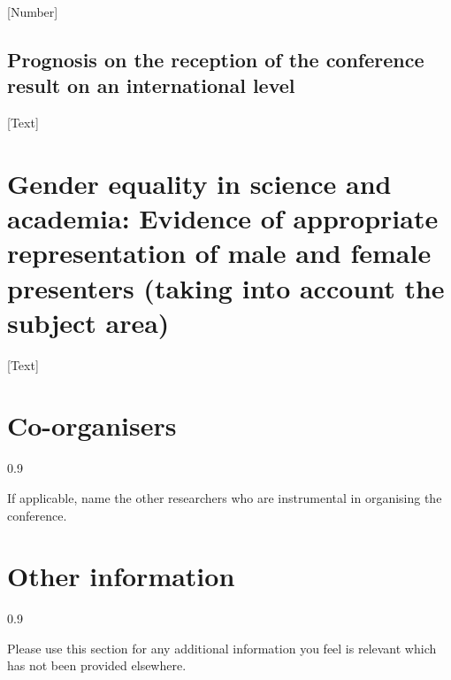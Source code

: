 \documentclass[a4paper,11pt]{article}
\newenvironment{comment}{%
  \begin{spacing}{0.9}
    \footnotesize
    \it
  }{%
  \end{spacing}
}
\begin{document}
[Number]

\subsection{Prognosis on the reception of the conference result on an international level}

[Text]

\section{Gender equality in science and academia: Evidence of appropriate representation of male and female presenters (taking into account the subject area)}

[Text]

\section{Co-organisers}

\begin{comment}
If applicable, name the other researchers who are instrumental in organising the conference.
\end{comment}


\section{Other information}

\begin{comment}
Please use this section for any additional information you feel is relevant which has not been provided elsewhere.  
\end{comment}
\end{document}

